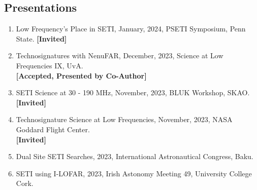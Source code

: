 \documentclass[a4paper,12pt]{article}
\numberwithin{equation}{section}
\begin{document}
\subsection*{Presentations}
\begin{enumerate}
\item Low Frequency's Place in SETI, January, 2024, PSETI Symposium, Penn State. \hfill \textbf{[Invited]}
\item Technosignatures with NenuFAR, December, 2023, Science at Low Frequencies IX, UvA. \\  \hfill \textbf{[Accepted, Presented by Co-Author]}
\item SETI Science at 30 - 190 MHz, November, 2023, BLUK Workshop, SKAO.\\ \textbf{[Invited]}
\item Technosignature Science at Low Frequencies, November, 2023, NASA Goddard Flight Center. \hfill \\ \textbf{[Invited]}
\item Dual Site SETI Searches, 2023, International Astronautical Congress, Baku. 
\item SETI using I-LOFAR, 2023, Irish Astonomy Meeting 49, University College Cork. 
\end{enumerate}

\newpage
\end{document}
